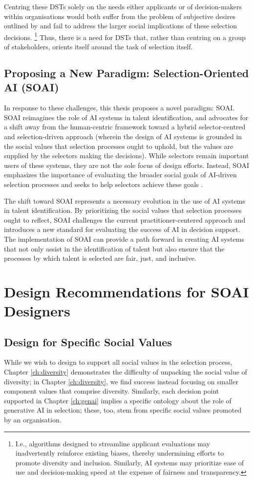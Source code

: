 Centring these DSTs solely on the needs either applicants or of decision-makers within organisations would both suffer from the problem of subjective desires outlined by \textcite{Lipton} and fail to address the larger social implications of these selection decisions. \footnote{I.e., algorithms designed to streamline applicant evaluations may inadvertently reinforce existing biases, thereby undermining efforts to promote diversity and inclusion. Similarly, AI systems may prioritize ease of use and decision-making speed at the expense of fairness and transparency.} Thus, there is a need for DSTs that, rather than centring on a group of stakeholders, orients itself around the task of selection itself.

\subsection{Proposing a New Paradigm: Selection-Oriented AI (SOAI)}
In response to these challenges, this thesis proposes a novel paradigm: SOAI. SOAI reimagines the role of AI systems in talent identification, and advocates for a shift away from the human-centric framework toward a hybrid selector-centred and selection-driven approach (wherein the design of AI systems is grounded in the social values that selection processes ought to uphold, but the values are supplied by the selectors making the decisions). While selectors remain important users of these systems, they are not the sole focus of design efforts. Instead, SOAI emphasizes the importance of evaluating the broader social goals of AI-driven selection processes and seeks to help selectors achieve these goals \cite{batyavalue}.

The shift toward SOAI represents a necessary evolution in the use of AI systems in talent identification. By prioritizing the social values that selection processes ought to reflect, SOAI challenges the current practitioner-centered approach and introduces a new standard for evaluating the success of AI in decision support. The implementation of SOAI can provide a path forward in creating AI systems that not only assist in the identification of talent but also ensure that the processes by which talent is selected are fair, just, and inclusive.

\section{Design Recommendations for SOAI Designers}
\subsection{Design for Specific Social Values}
While we wish to design to support all social values in the selection process, Chapter \ref{ch:diversity} demonstrates the difficulty of unpacking the social value of diversity; in Chapter \ref{ch:diversity}, we find success instead focusing on smaller component values that comprise diversity. Similarly, each decision point supported in Chapter \ref{ch:genai} implies a specific ontology about the role of generative AI in selection; these, too, stem from specific social values promoted by an organisation.

